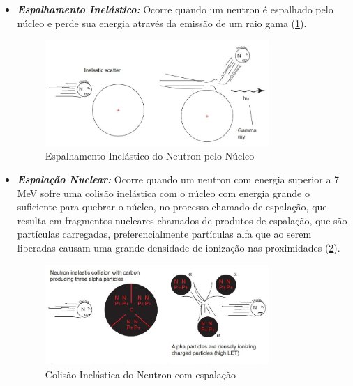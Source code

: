 \documentclass[11pt,a4paper]{article}
\begin{document}
\begin{itemize}
\begin{itemize}
				\item \textbf{\textit{\textcolor{CarnationPink}{Espalhamento Inelástico}:}} Ocorre quando um neutron é espalhado pelo núcleo e perde sua energia através da emissão de um raio gama (\ref{fig:espalhamentoInelasticoNeutron}). 
				
					\begin{figure}[h]
						\centering
						\includegraphics[width=0.8\textwidth]{Imagens/espalhamentoInelasticoNeutron.JPG}
						\caption{Espalhamento Inelástico do Neutron pelo Núcleo}
						\label{fig:espalhamentoInelasticoNeutron}                
					\end{figure}
				
				\item \textbf{\textit{\textcolor{CarnationPink}{Espalação Nuclear}:}} Ocorre quando um neutron com energia superior a 7 MeV sofre uma colisão inelástica com o núcleo com energia grande o suficiente para quebrar o núcleo, no processo chamado de espalação, que resulta em fragmentos nucleares chamados de produtos de espalação, que são partículas carregadas, preferencialmente partículas alfa que ao serem liberadas causam uma grande densidade de ionização nas proximidades (\ref{fig:espalacaoNeutron}).
				
				\begin{figure}[h]
					\centering
					\includegraphics[width=0.8\textwidth]{Imagens/espalacaoNeutron.JPG}
					\caption{Colisão Inelástica do Neutron com espalação}    
					\label{fig:espalacaoNeutron}
				\end{figure}
			\end{itemize}


\end{itemize}
\end{document}
